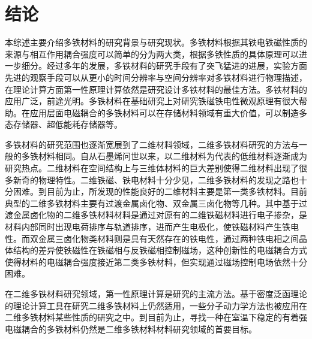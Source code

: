 \chapter*{结论}

本综述主要介绍多铁材料的研究背景与研究现状。多铁材料根据其铁电铁磁性质的来源与相互作用耦合强度可以简单的分为两大类，根据多铁性质的具体原理可以进一步细分。经过多年的发展，多铁材料的研究手段有了突飞猛进的进展，实验方面先进的观察手段可以从更小的时间分辨率与空间分辨率对多铁材料进行物理描述，在理论计算方面第一性原理计算依然是研究设计多铁材料的最佳方法。多铁材料的应用广泛，前途光明。多铁材料在基础研究上对研究铁磁铁电性微观原理有很大帮助。在应用层面电磁耦合的多铁材料可以在存储材料领域有重大价值，可以制造多态存储器、超低能耗存储器等。

多铁材料的研究范围也逐渐宽展到了二维材料领域，二维多铁材料研究的方法与一般的多铁材料相同。自从石墨烯问世以来，以二维材料为代表的低维材料逐渐成为研究热点。二维材料在空间结构上与三维体材料的巨大差别使得二维材料出现了很多新奇的物理特性。二维铁磁、铁电材料十分少见，二维多铁材料的发现之路也十分困难。到目前为止，所发现的性能良好的二维材料主要是第一类多铁材料。目前典型的二维多铁材料主要有过渡金属卤化物、双金属三卤化物等几种。其中基于过渡金属卤化物的二维多铁材料材料是通过对原有的二维铁磁材料进行电子掺杂，是材料内部同时出现电荷排序与轨道排序，进而产生电极化，使铁磁材料产生铁电性。而双金属三卤化物类材料则是具有天然存在的铁电性，通过两种铁电相之间晶体结构的差异使铁磁性在铁磁相与反铁磁相控制磁场，这种创新性的电磁耦合方式使得材料的电磁耦合强度接近第二类多铁材料，但实现通过磁场控制电场依然十分困难。

在二维多铁材料研究领域，第一性原理计算是研究的主流方法。基于密度泛函理论的理论计算工具在研究二维多铁材料上仍然适用，一些分子动力学方法也被应用在二维多铁材料某些性质的研究之中。到目前为止，寻找一种在室温下稳定的有着强电磁耦合的多铁材料仍然是二维多铁材料材料研究领域的首要目标。